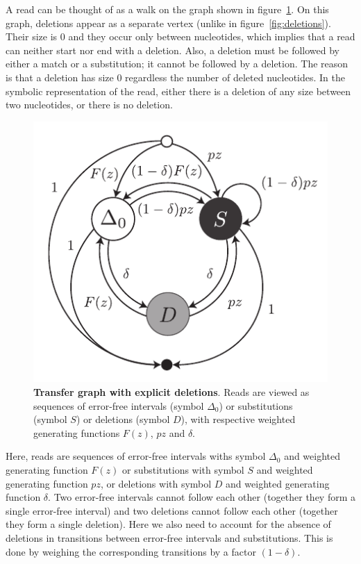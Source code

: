 \documentclass{article}
\begin{document}
A read can be thought of as a walk on the graph shown in
figure~\ref{fig:deletions2}. On this graph, deletions appear as a separate
vertex (unlike in figure~\ref{fig:deletions}). Their size is $0$ and they
occur only between nucleotides, which implies that a read can neither
start nor end with a deletion. Also, a deletion must be followed by either
a match or a substitution; it cannot be followed by a deletion. The reason
is that a deletion has size $0$ regardless the number of deleted
nucleotides. In the symbolic representation of the read, either there is a
deletion of any size between two nucleotides, or there is no deletion.

\begin{figure}[h]
\centering
\includegraphics[scale=0.9]{deletions2.pdf}
\caption{\textbf{Transfer graph with explicit deletions}. 
Reads are viewed as sequences of error-free intervals (symbol $\Delta_0$)
or substitutions (symbol $S$) or deletions (symbol $D$), with respective
weighted generating functions $F(z)$, $pz$ and $\delta$.}
\label{fig:deletions2}
\end{figure}

Here, reads are sequences of error-free intervals withs symbol $\Delta_0$
and weighted generating function $F(z)$ or substitutions with symbol $S$
and weighted generating function $pz$, or deletions with symbol $D$ and
weighted generating function $\delta$. Two error-free intervals cannot
follow each other (together they form a single error-free interval) and
two deletions cannot follow each other (together they form a single
deletion). Here we also need to account for the absence of deletions in
transitions between error-free intervals and substitutions. This is done
by weighing the corresponding transitions by a factor $(1-\delta)$.
\end{document}
